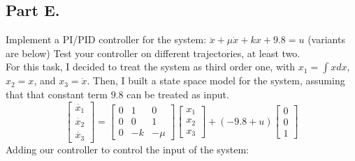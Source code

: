 \documentclass[a4paper,12pt]{article}
\begin{document}
    \subsection*{Part E.}
    Implement a PI/PID controller for the system: 
    $\ddot{x}+\mu \dot{x} +kx+ 9.8 = u$
    (variants are below) Test your controller on different trajectories, at 
    least two.\\
    For this task, I decided to treat the system as third order one, with $x_1 = 
    \int xdx$, $x_2 = x$, and $x_3 = \dot x$. Then, I built a state space model 
    for the system, assuming that that constant term $9.8$ can be treated as input.
    \begin{equation*}
        \begin{bmatrix}
            \dot{x_1}\\
            \dot{x_2}\\
            \dot{x_3}
        \end{bmatrix}
        =
        \begin{bmatrix}
            0 & 1 & 0\\
            0 & 0 & 1\\
            0 & -k & -\mu
        \end{bmatrix}
        \begin{bmatrix}
            x_1\\
            x_2\\
            x_3
        \end{bmatrix}
        + (-9.8 + u)
        \begin{bmatrix}
            0\\
            0\\
            1
        \end{bmatrix}
    \end{equation*}
    Adding our controller to control the input of the system:
\end{document}
